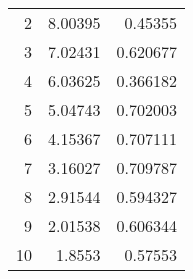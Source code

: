 \begin{tabular}{rrr}
    2 & 8.00395 & 0.45355 \\
    3 & 7.02431 & 0.620677 \\
    4 & 6.03625 & 0.366182 \\
    5 & 5.04743 & 0.702003 \\
    6 & 4.15367 & 0.707111 \\
    7 & 3.16027 & 0.709787 \\
    8 & 2.91544 & 0.594327 \\
    9 & 2.01538 & 0.606344 \\
    10 & 1.8553 & 0.57553 \\
\end{tabular}
